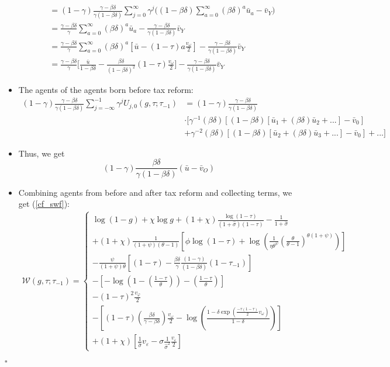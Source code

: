 \documentclass{article}
\begin{document}
\begin{itemize}
\begin{align*}
&=
(1-\gamma) \frac{\gamma - \beta \delta}{\gamma(1-\beta\delta)} \sum_{j = 0}^{\infty} \gamma^j \Bigg( (1-\beta\delta) \sum_{a=0}^\infty (\beta\delta)^a \bar u_a - \bar v_Y \Bigg)\\
&=
\frac{\gamma - \beta \delta}{\gamma} \sum_{a=0}^\infty (\beta\delta)^a \bar u_a - \frac{\gamma - \beta \delta}{\gamma (1- \beta\delta)}\bar v_Y\\
&=
\frac{\gamma - \beta \delta}{\gamma} \sum_{a=0}^\infty (\beta\delta)^a [\bar u - (1-\tau)a \frac{v_\omega}{2}] - \frac{\gamma - \beta \delta}{\gamma (1- \beta\delta)}\bar v_Y\\
&=
\frac{\gamma - \beta \delta}{\gamma} \Bigg[\frac{\bar u}{1-\beta\delta} - \frac{\beta \delta}{(1-\beta\delta)^2}(1-\tau)\frac{v_\omega}{2}\Bigg] - \frac{\gamma - \beta \delta}{\gamma (1- \beta\delta)}\bar v_Y
\end{align*}
\item The agents of the agents born before tax reform:
\begin{align*}
(1-\gamma) \frac{\gamma - \beta \delta}{\gamma(1-\beta\delta)} \sum_{j = -\infty}^{-1} \gamma^j U_{j,0} (g, \tau; \tau_{-1})
&= (1-\gamma) \frac{\gamma - \beta \delta}{\gamma(1-\beta\delta)}  \\
&\cdot \Bigg[ \gamma^{-1}(\beta\delta)[(1-\beta\delta)[\bar u_1 + (\beta \delta)\bar u _2 +... ]-\bar v_0] \\
&+
\gamma^{-2}(\beta\delta)[(1-\beta\delta)[\bar u_2 + (\beta \delta)\bar u _3 +... ]-\bar v_0] +...  \Bigg]
\end{align*}
\item Thus, we get
$$
(1-\gamma)\frac{\beta\delta}{\gamma(1-\beta\delta)}(\bar u - \bar v_O)
$$
\item Combining agents from before and after tax reform and collecting terms, we get (\ref{cf_swf}):
\begin{align*}
\mathcal{W}(g, \tau; \tau_{-1})=
\begin{cases}
\log(1-g) + \chi \log g + (1+\chi) \frac{\log(1-\tau)}{(1+\hat\sigma)(1-\tau)}- \frac{1}{1+\hat\sigma} \\
+(1+\chi)\frac{1}{(1+\psi)(\theta-1)} [ \phi \log(1-\tau) + \log ( \frac{1}{\eta\theta^\psi} ( \frac{\theta}{\theta - 1} )^{\theta(1+\psi)} ) ]\\
-\frac{\psi}{(1+\psi)\theta} [ (1-\tau) - \frac{\beta\delta}{\gamma} \frac{(1-\gamma)}{(1-\beta\delta)}(1-\tau_{-1}) ]\\
-[ - \log(1-(\frac{1-\tau}{\theta})) - (\frac{1-\tau}{\theta}) ]\\
-(1-\tau)^2\frac{v_\varphi}{2}\\
-[(1-\tau)(\frac{\beta\delta}{\gamma - \beta\delta})\frac{v_{\omega}}{2} - \log(\frac{1-\delta \exp(\frac{-\tau(1-\tau)}{2}v_\omega)}{1-\delta})]\\
+ (1 + \chi) [\frac{1}{\hat\sigma} v_\varepsilon - \sigma \frac{1}{\hat \sigma^2}\frac{v_\varepsilon}{2}]
\end{cases}
\end{align*}
\end{itemize}
$\square$
\end{document}
